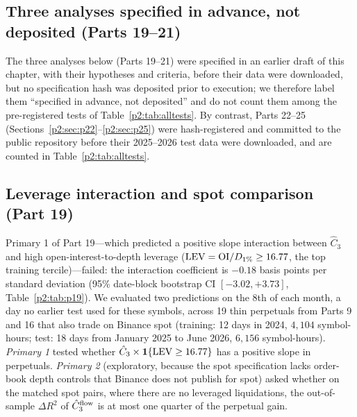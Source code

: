 \FloatBarrier

\subsection{Three analyses specified in advance, not deposited (Parts 19--21)}\label{p2:sec:p1921}
The three analyses below (Parts 19--21) were specified in an earlier draft of this chapter, with their hypotheses and criteria, before their data were downloaded, but no specification hash was deposited prior to execution; we therefore label them ``specified in advance, not deposited'' and do not count them among the pre-registered tests of Table~\ref{p2:tab:alltests}. By contrast, Parts 22--25 (Sections~\ref{p2:sec:p22}--\ref{p2:sec:p25}) were hash-registered and committed to the public repository before their 2025--2026 test data were downloaded, and are counted in Table~\ref{p2:tab:alltests}.

\subsection{Leverage interaction and spot comparison (Part 19)}\label{p2:sec:p19}
Primary 1 of Part 19---which predicted a positive slope interaction between $\hat C_3$ and high open-interest-to-depth leverage (${\rm LEV}={\rm OI}/D_{1\%}\ge16.77$, the top training tercile)---failed: the interaction coefficient is $-0.18$ basis points per standard deviation (95\% date-block bootstrap CI $[-3.02,+3.73]$, Table~\ref{p2:tab:p19}). We evaluated two predictions on the 8th of each month, a day no earlier test used for these symbols, across 19 thin perpetuals from Parts 9 and 16 that also trade on Binance spot (training: 12 days in 2024, $4{,}104$ symbol-hours; test: 18 days from January 2025 to June 2026, $6{,}156$ symbol-hours). \emph{Primary 1} tested whether $\hat C_3\times\mathbf{1}\{{\rm LEV}\ge16.77\}$ has a positive slope in perpetuals. \emph{Primary 2} (exploratory, because the spot specification lacks order-book depth controls that Binance does not publish for spot) asked whether on the matched spot pairs, where there are no leveraged liquidations, the out-of-sample $\Delta R^2$ of $\hat C_3^{\rm flow}$ is at most one quarter of the perpetual gain.

